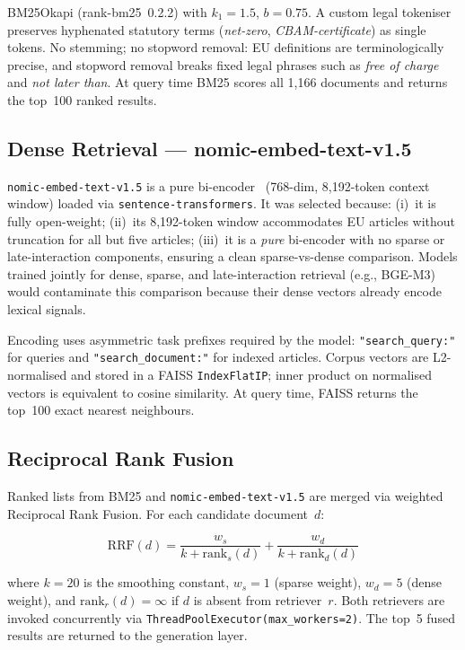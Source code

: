\documentclass[conference]{IEEEtran}
\newcommand{\nomic}{\texttt{nomic-embed-text-v1.5}\xspace}
\begin{document}
BM25Okapi (rank-bm25~0.2.2) with $k_1{=}1.5$, $b{=}0.75$.
A custom legal tokeniser preserves hyphenated statutory terms
(\textit{net-zero}, \textit{CBAM-certificate}) as single tokens.
No stemming; no stopword removal: EU definitions are terminologically
precise, and stopword removal breaks fixed legal phrases such as
\textit{free of charge} and \textit{not later than}.
At query time BM25 scores all 1{,}166 documents and returns the
top~100 ranked results.

\subsection{Dense Retrieval --- nomic-embed-text-v1.5}

\nomic is a pure bi-encoder~\cite{17} (768-dim, 8{,}192-token context window)
loaded via \texttt{sentence-transformers}.
It was selected because: (i)~it is fully open-weight; (ii)~its
8{,}192-token window accommodates EU articles without truncation for
all but five articles; (iii)~it is a \emph{pure} bi-encoder with no
sparse or late-interaction components, ensuring a clean
sparse-vs-dense comparison.
Models trained jointly for dense, sparse, and late-interaction
retrieval (e.g., BGE-M3) would contaminate this comparison because
their dense vectors already encode lexical signals.

Encoding uses asymmetric task prefixes required by the model:
\texttt{"search\_query:"} for queries and \texttt{"search\_document:"}
for indexed articles.
Corpus vectors are L2-normalised and stored in a FAISS
\texttt{IndexFlatIP}; inner product on normalised vectors is equivalent
to cosine similarity.
At query time, FAISS returns the top~100 exact nearest neighbours.

\subsection{Reciprocal Rank Fusion}

Ranked lists from BM25 and \nomic are merged via weighted Reciprocal
Rank Fusion.
For each candidate document~$d$:

\begin{equation}
  \mathrm{RRF}(d) = \frac{w_s}{k + \mathrm{rank}_s(d)}
                  + \frac{w_d}{k + \mathrm{rank}_d(d)}
  \label{eq:rrf}
\end{equation}

\noindent where $k{=}20$ is the smoothing constant,
$w_s{=}1$ (sparse weight), $w_d{=}5$ (dense weight), and
$\mathrm{rank}_r(d) = \infty$ if $d$ is absent from retriever~$r$.
Both retrievers are invoked concurrently via
\texttt{ThreadPool\-Executor(max\_workers=2)}.
The top~5 fused results are returned to the generation layer.
\end{document}
